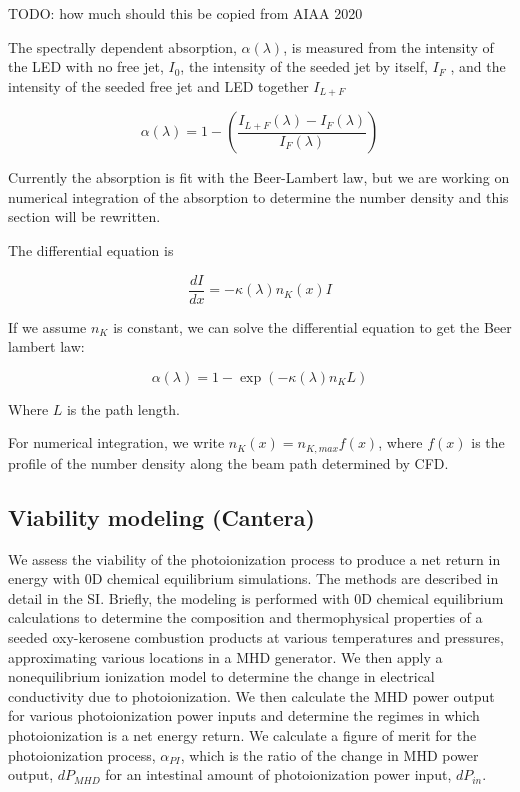 TODO: how much should this be copied from AIAA 2020

The spectrally dependent absorption, $\alpha(\lambda)$, is measured from the intensity of the LED with no free jet, $I_0$, the intensity
of the seeded jet by itself, $I_F$ , and the intensity of the seeded free jet and LED together $I_{L+F}$


\begin{equation}
    \alpha(\lambda) = 1 - \left(\frac{I_{L+F}(\lambda) - I_{F}(\lambda)}{I_F(\lambda)}\right)
\end{equation}

Currently the absorption is fit with the Beer-Lambert law, but we are working on numerical integration of the absorption to determine the number density and this section will be rewritten. 

The differential equation is 

\begin{equation}
    \frac{dI}{dx} = -\kappa(\lambda) n_K(x) I
\end{equation}

If we assume $n_K$ is constant, we can solve the differential equation to get the Beer lambert law:

\begin{equation}
    \alpha(\lambda) = 1 - \exp(-\kappa(\lambda) n_K L)
\end{equation}

Where $L$ is the path length.

For numerical integration, we write $n_K(x) = n_{K,max} f(x)$, where $f(x)$ is the profile of the number density along the beam path determined by CFD. 




\subsection{Viability modeling (Cantera)}

We assess the viability of the photoionization process to produce a net return in energy with 0D chemical equilibrium simulations. The methods are described in detail in the SI. Briefly, the modeling is performed with 0D chemical equilibrium calculations to determine the composition and thermophysical properties of a seeded oxy-kerosene combustion products at various temperatures and pressures, approximating various locations in a MHD generator. We then apply a nonequilibrium ionization model to determine the change in electrical conductivity due to photoionization. We then calculate the MHD power output for various photoionization power inputs and determine the regimes in which photoionization is a net energy return. We calculate a figure of merit for the photoionization process, $\alpha_{PI}$, which is the ratio of the change in MHD power output, $dP_{MHD}$ for an intestinal amount of photoionization power input, $dP_{in}$. 


